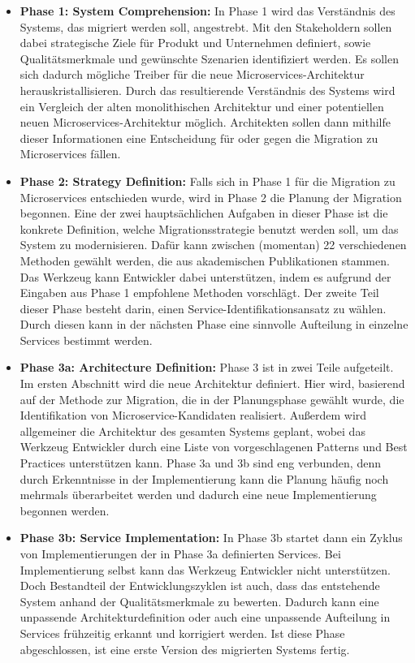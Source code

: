 \begin{itemize}
	\item \textbf{Phase 1: System Comprehension:}
	In Phase 1 wird das Verständnis des Systems, das migriert werden soll, angestrebt. 
	Mit den Stakeholdern sollen dabei strategische Ziele für Produkt und Unternehmen definiert, sowie Qualitätsmerkmale und gewünschte Szenarien identifiziert werden.
	Es sollen sich dadurch mögliche Treiber für die neue Microservices-Architektur herauskristallisieren.
	Durch das resultierende Verständnis des Systems wird ein Vergleich der alten monolithischen Architektur und einer potentiellen neuen Microservices-Architektur möglich.
	Architekten sollen dann mithilfe dieser Informationen eine Entscheidung für oder gegen die Migration zu Microservices fällen.
	\item \textbf{Phase 2: Strategy Definition:}
	Falls sich in Phase 1 für die Migration zu Microservices entschieden wurde, wird in Phase 2 die Planung der Migration begonnen.
	Eine der zwei hauptsächlichen Aufgaben in dieser Phase ist die konkrete Definition, welche Migrationsstrategie benutzt werden soll, um das System zu modernisieren.
	Dafür kann zwischen (momentan) 22 verschiedenen Methoden gewählt werden, die aus akademischen Publikationen stammen.
	Das Werkzeug kann Entwickler dabei unterstützen, indem es aufgrund der Eingaben aus Phase 1 empfohlene Methoden vorschlägt.
	Der zweite Teil dieser Phase besteht darin, einen Service-Identifikationsansatz zu wählen.
	Durch diesen kann in der nächsten Phase eine sinnvolle Aufteilung in einzelne Services bestimmt werden.
	\item \textbf{Phase 3a: Architecture Definition:}
	Phase 3 ist in zwei Teile aufgeteilt. 
	Im ersten Abschnitt wird die neue Architektur definiert. 
	Hier wird, basierend auf der Methode zur Migration, die in der Planungsphase gewählt wurde, die Identifikation von Microservice-Kandidaten realisiert.
	Außerdem wird allgemeiner die Architektur des gesamten Systems geplant, wobei das Werkzeug Entwickler durch eine Liste von vorgeschlagenen Patterns und Best Practices unterstützen kann.
	 Phase 3a und 3b sind eng verbunden, denn durch Erkenntnisse in der Implementierung kann die Planung häufig noch mehrmals überarbeitet werden und dadurch eine neue Implementierung begonnen werden. 
	\item \textbf{Phase 3b: Service Implementation:} In Phase 3b startet dann ein Zyklus von Implementierungen der in Phase 3a definierten Services.
	Bei Implementierung selbst kann das Werkzeug Entwickler nicht unterstützen.
	Doch Bestandteil der Entwicklungszyklen ist auch, dass das entstehende System anhand der Qualitätsmerkmale zu bewerten.
	Dadurch kann eine unpassende Architekturdefinition oder auch eine unpassende Aufteilung in Services frühzeitig erkannt und korrigiert werden.
	Ist diese Phase abgeschlossen, ist eine erste Version des migrierten Systems fertig.
\end{itemize}

